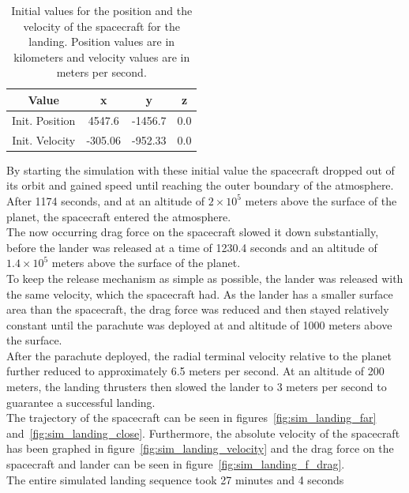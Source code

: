 \documentclass[reprint,english,notitlepage]{revtex4-2}
\begin{document}
    \begin{table}[h]
        \begin{tabular}{|c|c|c|c|}
            \hline
            Value & x & y & z \\
            \hline
            Init. Position & 4547.6 & -1456.7 & 0.0\\
            \hline
            Init. Velocity & -305.06 & -952.33 & 0.0\\
            \hline
        \end{tabular}
        \caption{Initial values for the position and the velocity of the spacecraft for the landing. Position values are in kilometers and velocity values are in meters per second.}
        \label{tab:initial_values}
    \end{table}

    By starting the simulation with these initial value the spacecraft dropped out of its orbit and gained speed until reaching the outer boundary of the atmosphere.
    After 1174 seconds, and at an altitude of $2 \times 10^5$ meters above the surface of the planet, the spacecraft entered the atmosphere.\\
    The now occurring drag force on the spacecraft slowed it down substantially, before the lander was released at a time of 1230.4 seconds and an altitude of $1.4 \times 10^5$ meters above the surface of the planet.\\
    To keep the release mechanism as simple as possible, the lander was released with the same velocity, which the spacecraft had.
    As the lander has a smaller surface area than the spacecraft, the drag force was reduced and then stayed relatively constant until the parachute was deployed at and altitude of 1000 meters above the surface.\\
    After the parachute deployed, the radial terminal velocity relative to the planet further reduced to approximately 6.5 meters per second.
    At an altitude of 200 meters, the landing thrusters then slowed the lander to 3 meters per second to guarantee a successful landing.\\
    The trajectory of the spacecraft can be seen in figures~\ref{fig:sim_landing_far} and~\ref{fig:sim_landing_close}.
    Furthermore, the absolute velocity of the spacecraft has been graphed in figure~\ref{fig:sim_landing_velocity} and the drag force on the spacecraft and lander can be seen in figure~\ref{fig:sim_landing_f_drag}.\\
    The entire simulated landing sequence took  27 minutes and 4 seconds
\end{document}
